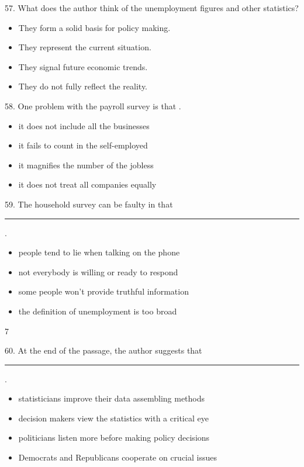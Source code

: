 \documentclass[UTF8,11pt]{ctexart}
\begin{document}
57. What does the author think of the unemployment figures and other statistics?


\begin{itemize}[leftmargin=2em,itemsep=.2em,topsep=.4em]\item[A.] They form a solid basis for policy making.
\item[B.] They represent the current situation.
\item[C.] They signal future economic trends.
\item[D.] They do not fully reflect the reality.
\end{itemize}

58. One problem with the payroll survey is that .


\begin{itemize}[leftmargin=2em,itemsep=.2em,topsep=.4em]\item[A.] it does not include all the businesses
\item[B.] it fails to count in the self-employed
\item[C.] it magnifies the number of the jobless
\item[D.] it does not treat all companies equally
\end{itemize}

59. The household survey can be faulty in that\par\noindent\rule{.95\linewidth}{.4pt}\par .


\begin{itemize}[leftmargin=2em,itemsep=.2em,topsep=.4em]\item[A.] people tend to lie when talking on the phone
\item[B.] not everybody is willing or ready to respond
\item[C.] some people won’t provide truthful information
\item[D.] the definition of unemployment is too broad
\end{itemize}

7


60. At the end of the passage, the author suggests that\par\noindent\rule{.95\linewidth}{.4pt}\par  .


\begin{itemize}[leftmargin=2em,itemsep=.2em,topsep=.4em]\item[A.] statisticians improve their data assembling methods
\item[B.] decision makers view the statistics with a critical eye
\item[C.] politicians listen more before making policy decisions
\item[D.] Democrats and Republicans cooperate on crucial issues
\end{itemize}
\end{document}
